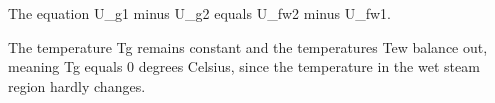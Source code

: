 The equation U_{g1} minus U_{g2} equals U_{fw2} minus U_{fw1}.

The temperature Tg remains constant and the temperatures Tew balance out, meaning Tg equals 0 degrees Celsius, since the temperature in the wet steam region hardly changes.